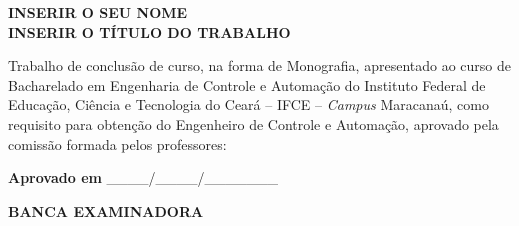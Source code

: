 
\begin{center}
\vspace{3cm}
\fontsize{12}{12}
\textbf{INSERIR O SEU NOME}\\
\vspace{1cm}
\textbf{INSERIR O TÍTULO DO TRABALHO}
\vspace{3cm}
\begin{flushright}
\begin{minipage}[15cm] {11cm}
Trabalho de conclusão de curso, na forma de Monografia, apresentado ao curso de Bacharelado em Engenharia de Controle e Automação do Instituto Federal de Educação, Ciência e Tecnologia do Ceará -- IFCE -- \textit{Campus} Maracanaú, como requisito para obtenção do Engenheiro de Controle e Automação, aprovado pela comissão formada pelos professores:

\end{minipage}
\end{flushright}

\vspace{1.5cm}
\begin{flushleft}
\textbf{Aprovado em}\hspace{4pt} \_\_\_\_/\_\_\_\_/\_\_\_\_\_\_\_
\end{flushleft}
\vspace{1.5cm}
\textbf{BANCA EXAMINADORA}


\vspace{0.8cm}


\vspace{0.8cm}

\end{center}